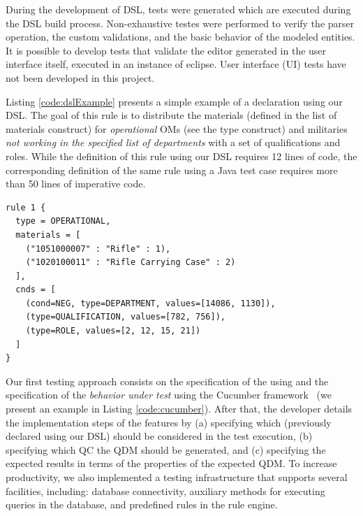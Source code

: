 During the development of DSL, tests were generated which are executed during the DSL build process. Non-exhaustive testes were performed to verify the parser operation, the custom validations, and the basic behavior of the modeled entities. It is possible to develop tests that validate the editor generated in the user interface itself, executed in an instance of eclipse. User interface (UI) tests have not been developed in this project.



Listing \ref{code:dslExample} presents a simple example of a \shc declaration using our DSL. The goal of this rule is to distribute the materials (defined in the list of materials construct) for \emph{operational} OMs (see the type construct) and militaries \emph{not working in the specified list of departments} with a set of qualifications and roles. While the definition of this rule using our DSL requires 12 lines of code, the corresponding definition of the same rule using a Java test case requires more than 50 lines of imperative code.

\begin{small}
	\begin{lstlisting}[frame=single, language=DSL, caption={\it Example of a \shc declaration using our DSL}, label={code:dslExample}]
rule 1 { 
  type = OPERATIONAL, 
  materials = [ 
    ("1051000007" : "Rifle" : 1), 
    ("1020100011" : "Rifle Carrying Case" : 2)
  ], 
  cnds = [ 
    (cond=NEG, type=DEPARTMENT, values=[14086, 1130]),
    (type=QUALIFICATION, values=[782, 756]), 
    (type=ROLE, values=[2, 12, 15, 21])
  ]
}
	\end{lstlisting}
\end{small}

Our first testing approach consists on the specification of the \callers using \hlrdsl and the specification of the
\emph{behavior under test} using the Cucumber framework~\cite{wynne2017cucumber} (we present an example in Listing \ref{code:cucumber}).
After that, the developer details the implementation steps of the features by (a) specifying which
\callers (previously declared using our DSL) should be considered in the test execution, (b) specifying
which QC the QDM should be generated, and (c) specifying the expected results in terms of the properties
of the expected QDM. To increase productivity, we also implemented a testing  infrastructure that supports several facilities,
including: database connectivity, auxiliary methods for executing queries in the database, and predefined
rules in the rule engine.

